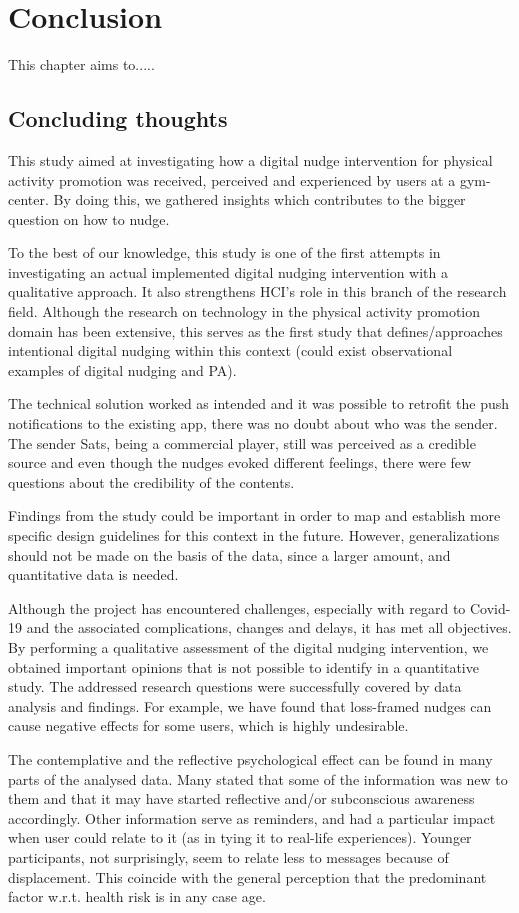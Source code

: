 \chapter{Conclusion} 
This chapter aims to.....

\section{Concluding thoughts}
This study aimed at investigating how a digital nudge intervention for physical activity promotion was received, perceived and experienced by users at a gym-center. By doing this, we gathered insights which contributes to the bigger question on how to nudge.

To the best of our knowledge, this study is one of the first attempts in investigating an actual implemented digital nudging intervention with a qualitative approach. It also strengthens HCI's role in this branch of the research field. Although the research on technology in the physical activity promotion domain has been extensive, this serves as the first study that defines/approaches intentional digital nudging within this context (could exist observational examples of digital nudging and PA). 

The technical solution worked as intended and it was possible to retrofit the push notifications to the existing app, there was no doubt about who was the sender. The sender Sats, being a commercial player, still was perceived as a credible source and even though the nudges evoked different feelings, there were few questions about the credibility of the contents.

Findings from the study could be important in order to map and establish more specific design guidelines for this context in the future. However, generalizations should not be made on the basis of the data, since a larger amount, and quantitative data is needed.

Although the project has encountered challenges, especially with regard to Covid-19 and the associated complications, changes and delays, it has met all objectives. By performing a qualitative assessment of the digital nudging intervention, we obtained important opinions that is not possible to identify in a quantitative study. The addressed research questions were successfully covered by data analysis and findings. For example, we have found that loss-framed nudges can cause negative effects for some users, which is highly undesirable. 

The contemplative and the reflective psychological effect can be found in many parts of the analysed data. Many stated that some of the information was new to them and that it may have started reflective and/or subconscious awareness accordingly. Other information serve as reminders, and had a particular impact when user could relate to it (as in tying it to real-life experiences). Younger participants, not surprisingly, seem to relate less to messages because of displacement. This coincide with the general perception that the predominant factor w.r.t. health risk is in any case age. 

